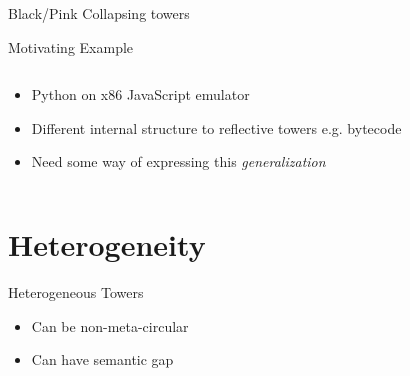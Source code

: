 \documentclass{beamer}
\begin{document}
\begin{frame}{Black/Pink}
Collapsing towers
\end{frame}

\begin{frame}{Motivating Example}
  \begin{columns}
    \begin{column}{0.5\textwidth}
      \begin{itemize}
        \item Python on x86 JavaScript emulator
        \item Different internal structure to reflective towers e.g. bytecode
        \item Need some way of expressing this \textit{generalization}
      \end{itemize}
    \end{column}
    \begin{column}{0.5\textwidth}
      \begin{figure}
        \centering
      \end{figure}
    \end{column}
  \end{columns}
\end{frame}

\section{Heterogeneity}
\begin{frame}{Heterogeneous Towers}
    \begin{itemize}
        \item Can be non-meta-circular
        \item Can have semantic gap
    \end{itemize}
\end{frame}
\end{document}
